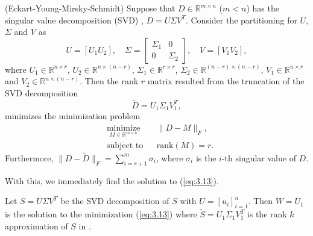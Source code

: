 \begin{theorem} \label{theorem:3.1}
(Eckart-Young-Mirsky-Schmidt) Suppose that $D\in \mathbb R^{m\times n}$ ($m<n$) has the singular value decomposition (SVD) \cite{Markovsky:2011:LRA:2103589}, $D = U \Sigma V^T$. Consider the partitioning for $U$, $\Sigma$ and $V$ as
\begin{equation} \label{eq:3.14}
	U = [U_1 U_2], \quad \Sigma =
	\begin{bmatrix}
		\Sigma_1 & 0 \\
		0 & \Sigma_2
	\end{bmatrix}
	, \quad V = [V_1 V_2],
\end{equation}
where $U_1\in \mathbb R^{n\times r}$, $U_2 \in \mathbb R^{n\times (n-r)}$, $\Sigma_1 \in \mathbb R^{r\times r}$, $\Sigma_2 \in \mathbb R^{(n-r)\times (n-r)}$, $V_1 \in \mathbb R^{n\times r}$ and $V_2 \in \mathbb R^{n\times (n-r)}$. Then the rank $r$ matrix resulted from the truncation of the SVD decomposition
\begin{equation} \label{eq:3.15}
	\tilde D = U_1 \Sigma_1 V_1^T,
\end{equation}
minimizes the minimization problem
\begin{equation} \label{eq:3.16}
\begin{aligned}
&  \underset{M\in\mathbb R^{m\times n}}{\text{minimize}}
& & \| D - M \|_F, \\
& \text{subject to}
& & \text{rank}(M) = r.
\end{aligned}
\end{equation}
Furthermore, $\| D - \tilde D \|_F = \sum_{i=r+1}^{m} \sigma_i$, where $\sigma_i$ is the $i$-th singular value of $D$.
\end{theorem} \label{theorem:3.2}
With this, we immediately find the solution to (\ref{eq:3.13}).
\begin{theorem} \label{theorem:3.2}
\cite{doi:10.1137/1.9780898718713} Let $S = U \Sigma V^T$ be the SVD decomposition of $S$ with $U = [u_i]_{i=1}^n$. Then $W = U_1$ is the solution to the minimization (\ref{eq:3.13}) where $\tilde S = U_1\Sigma_1 V_1^T$ is the rank $k$ approximation of $S$ in .
\end{theorem}

